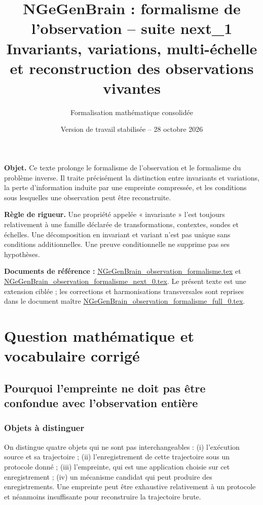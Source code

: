 \documentclass[11pt,oneside]{book}
\title{\Huge\bfseries NGeGenBrain : formalisme de l'observation -- suite next\_1\\[0.6em]\Large Invariants, variations, multi-échelle et reconstruction des observations vivantes}
\author{Formalisation mathématique consolidée}
\date{Version de travail stabilisée -- 28 octobre 2026}
\theoremstyle{definition}\newtheorem{definition}[theoreme]{Définition}\newtheorem{hypothese}[theoreme]{Hypothèse explicite}\newtheorem{convention}[theoreme]{Convention}\newtheorem{critere}[theoreme]{Critère}
\theoremstyle{remark}\newtheorem{remarque}[theoreme]{Remarque}\newtheorem{contreexemple}[theoreme]{Contre-exemple}
\begin{document}
\frontmatter\maketitle\thispagestyle{empty}
\begin{center}\begin{minipage}{0.91\textwidth}
\textbf{Objet.} Ce texte prolonge le formalisme de l'observation et le formalisme du problème inverse. Il traite précisément la distinction entre invariants et variations, la perte d'information induite par une empreinte compressée, et les conditions sous lesquelles une observation peut être reconstruite.

\medskip\textbf{Règle de rigueur.} Une propriété appelée « invariante » l'est toujours relativement à une famille déclarée de transformations, contextes, sondes et échelles. Une décomposition en invariant et variant n'est pas unique sans conditions additionnelles. Une preuve conditionnelle ne supprime pas ses hypothèses.
\end{minipage}\end{center}
\vfill\noindent\textbf{Documents de référence :} \url{NGeGenBrain_observation_formalisme.tex} et \url{NGeGenBrain_observation_formalisme_next_0.tex}. Le présent texte est une extension ciblée ; les corrections et harmonisations transversales sont reprises dans le document maître \url{NGeGenBrain_observation_formalisme_full_0.tex}.
\clearpage\tableofcontents\mainmatter

\part{Question mathématique et vocabulaire corrigé}
\chapter{Pourquoi l'empreinte ne doit pas être confondue avec l'observation entière}
\section{Objets à distinguer}
On distingue quatre objets qui ne sont pas interchangeables : (i) l'exécution source et sa trajectoire ; (ii) l'enregistrement de cette trajectoire sous un protocole donné ; (iii) l'empreinte, qui est une application choisie sur cet enregistrement ; (iv) un mécanisme candidat qui peut produire des enregistrements. Une empreinte peut être exhaustive relativement à un protocole et néanmoins insuffisante pour reconstruire la trajectoire brute.
\end{document}
